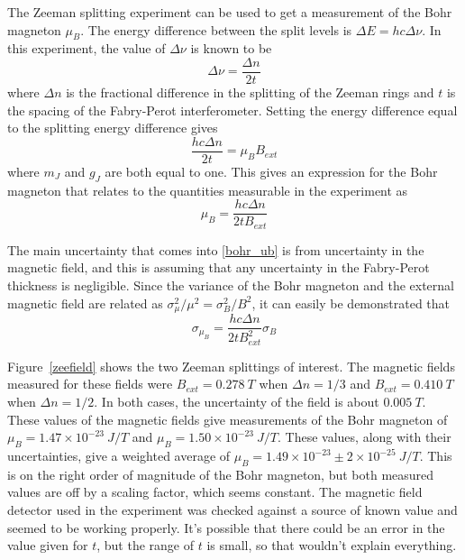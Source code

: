 \documentclass[11pt,letterpaper]{article}
\begin{document}
The Zeeman splitting experiment can be used to get a measurement of the Bohr
magneton $\mu_B$. The energy difference between the split levels is
$\Delta E = hc \Delta \nu$. In this experiment, the value of $\Delta \nu$ is
known to be \cite{ExpModern}
\begin{equation}
    \Delta \nu = \frac{\Delta n}{2t}
\end{equation}
where $\Delta n$ is the fractional difference in the splitting of the Zeeman
rings and $t$ is the spacing of the Fabry-Perot interferometer. Setting the
energy difference equal to the splitting energy difference gives
\begin{equation}
    \frac{hc\Delta n}{2t} = \mu_B B_{ext}
\end{equation}
where $m_J$ and $g_J$ are both equal to one. This gives an expression for the
Bohr magneton that relates to the quantities measurable in the experiment as
\begin{equation}
    \mu_B = \frac{hc\Delta n}{2tB_{ext}}
    \label{bohr_ub}
\end{equation}

The main uncertainty that comes into \eqref{bohr_ub} is from uncertainty in the
magnetic field, and this is assuming that any uncertainty in the Fabry-Perot
thickness is negligible. Since the variance of the Bohr magneton and the
external magnetic field are related as
$\sigma^2_\mu / \mu^2 = \sigma^2_B / B^2$, it can easily be demonstrated that
\begin{equation}
    \sigma_{\mu_B} = \frac{hc\Delta n}{2tB^2_{ext}} \sigma_B
\end{equation}

Figure~\ref{zeefield} shows the two Zeeman splittings of interest. The magnetic
fields measured for these fields were $B_{ext} = 0.278\ T$ when $\Delta n = 1/3$
and $B_{ext} = 0.410\ T$ when $\Delta n = 1/2$. In both cases, the uncertainty
of the field is about $0.005\ T$. These values of the magnetic fields give
measurements of the Bohr magneton of $\mu_B = 1.47\times 10^{-23}\ J/T$ and 
$\mu_B = 1.50\times 10^{-23}\ J/T$. These values, along with their
uncertainties, give a weighted average of $\mu_B = 1.49\times 10^{-23} \pm
2\times 10^{-25}\ J/T$. This is on the right order of magnitude of the Bohr
magneton, but both measured values are off by a scaling factor, which seems
constant. The magnetic field detector used in the experiment was checked against
a source of known value and seemed to be working properly. It's possible that
there could be an error in the value given for $t$, but the range of $t$ is
small, so that wouldn't explain everything.
\end{document}
